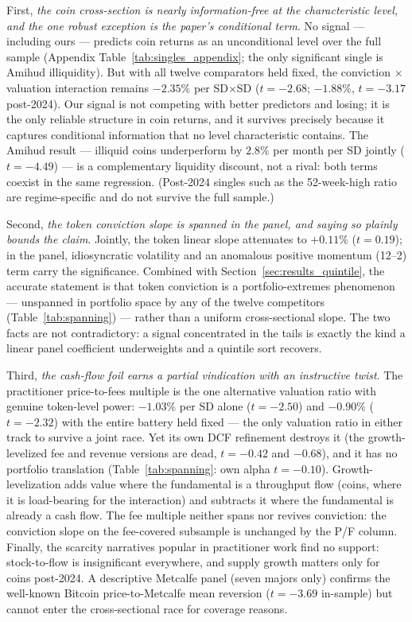 \documentclass[12pt]{article}
\begin{document}
First, \textit{the coin cross-section is nearly information-free at the characteristic
level, and the one robust exception is the paper's conditional term}. No signal ---
including ours --- predicts coin returns as an unconditional level over the full sample
(Appendix Table~\ref{tab:singles_appendix}; the only significant single is Amihud
illiquidity). But with all twelve comparators held fixed, the conviction $\times$
valuation interaction remains $-2.35\%$ per SD$\times$SD ($t=-2.68$; $-1.88\%$,
$t=-3.17$ post-2024). Our signal is not competing with better predictors and losing;
it is the only reliable structure in coin returns, and it survives precisely because it
captures conditional information that no level characteristic contains. The Amihud
result --- illiquid coins underperform by $2.8\%$ per month per SD jointly
($t=-4.49$) --- is a complementary liquidity discount, not a rival: both terms coexist
in the same regression. (Post-2024 singles such as the 52-week-high ratio are
regime-specific and do not survive the full sample.)

Second, \textit{the token conviction slope is spanned in the panel, and saying so
plainly bounds the claim}. Jointly, the token linear slope attenuates to $+0.11\%$
($t=0.19$); in the panel, idiosyncratic volatility and an anomalous positive
momentum (12--2) term carry the significance. Combined with
Section~\ref{sec:results_quintile}, the accurate statement is that token conviction is
a portfolio-extremes phenomenon --- unspanned in portfolio space by any of the twelve
competitors (Table~\ref{tab:spanning}) --- rather than a uniform cross-sectional slope.
The two facts are not contradictory: a signal concentrated in the tails is exactly the
kind a linear panel coefficient underweights and a quintile sort recovers.

Third, \textit{the cash-flow foil earns a partial vindication with an instructive
twist}. The practitioner price-to-fees multiple is the one alternative valuation ratio
with genuine token-level power: $-1.03\%$ per SD alone ($t=-2.50$) and $-0.90\%$
($t=-2.32$) with the entire battery held fixed --- the only valuation ratio in either
track to survive a joint race. Yet its own DCF refinement destroys it (the
growth-levelized fee and revenue versions are dead, $t=-0.42$ and $-0.68$), and it has
no portfolio translation (Table~\ref{tab:spanning}: own alpha $t=-0.10$).
Growth-levelization adds value where the fundamental is a throughput flow (coins,
where it is load-bearing for the interaction) and subtracts it where the fundamental
is already a cash flow. The fee multiple neither spans nor revives conviction: the
conviction slope on the fee-covered subsample is unchanged by the P/F column. Finally,
the scarcity narratives popular in practitioner work find no support: stock-to-flow is
insignificant everywhere, and supply growth matters only for coins post-2024. A
descriptive Metcalfe panel (seven majors only) confirms the well-known Bitcoin
price-to-Metcalfe mean reversion ($t=-3.69$ in-sample) but cannot enter the
cross-sectional race for coverage reasons.
\end{document}
